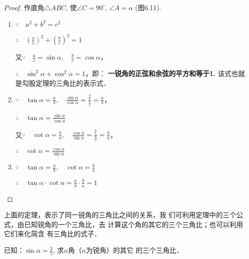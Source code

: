 \begin{proof}
    作直角$\triangle ABC$, 使$\angle C=90^{\circ}$, $\angle A=\alpha$ (图6.11).
    \begin{figure}[htp]
        \centering
        \caption{}
    \end{figure}
    
\begin{enumerate}
    \item $\because\quad  a^2+b^2=c^2$
    
    $\therefore\quad \left(\frac{a}{c}\right)^2+\left(\frac{b}{c}\right)^2=1$

    又$\because\quad \frac{a}{c}=\sin\alpha,\quad \frac{b}{c}=\cos\alpha$，

    $\therefore\quad \sin^2\alpha  +\cos^2\alpha =1$，即：
\textbf{一锐角的正弦和余弦的平方和等于1.}
该式也就是勾股定理的三角比的表示式．

\item $\because\quad \tan\alpha=\frac{a}{b},\quad \frac{\sin\alpha}{\cos\alpha}=\frac{\frac{a}{c}}{\frac{b}{c}}=\frac{a}{b}$，

$\therefore\quad \tan\alpha=\frac{\sin\alpha}{\cos\alpha}$

又$\because\quad \cot\alpha=\frac{b}{a},\quad \frac{\cos\alpha}{\sin\alpha}=\frac{\frac{b}{c}}{\frac{a}{c}}=\frac{b}{a}$，

$\therefore\quad \cot\alpha=\frac{\cos\alpha}{\sin\alpha}$

\item $\because\quad \tan\alpha=\frac{a}{b},\quad \cot\alpha=\frac{b}{a}$

$\therefore\quad \tan\alpha\cdot \cot\alpha=\frac{a}{b}\cdot \frac{b}{a}=1$
\end{enumerate}
\end{proof}

上面的定理，表示了同一锐角的三角比之间的关系，我
们可利用定理中的三个公式，由已知锐角的一个三角比，去
计算这个角的其它的三个三角比；也可以利用它们来化简含
有三角比的式子．


\begin{example}
    已知：$\sin\alpha=\frac{3}{5}$, 
    求$\alpha$角（$\alpha$为锐角）的其它
    的三个三角比．
\end{example}



